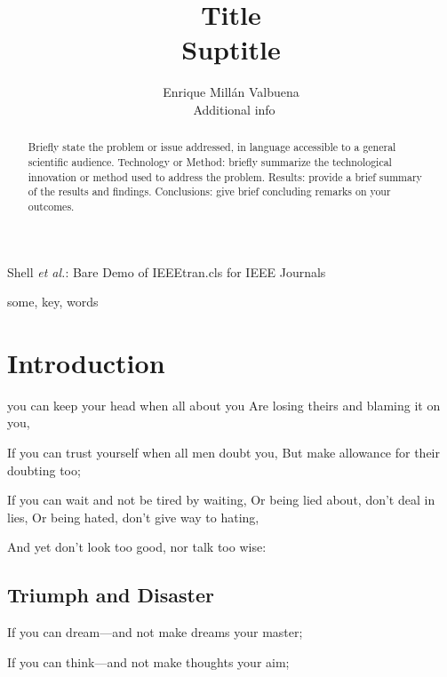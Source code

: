 \documentclass[a4paper, technote, compsoc]{IEEEtran}
\begin{document}
\title{Title \\ \Large{Suptitle}}

\author{Enrique Millán Valbuena \\ \small{Additional info}}%
        
{Shell \MakeLowercase{\textit{et al.}}: Bare Demo of IEEEtran.cls for IEEE Journals}

\maketitle

\begin{abstract}
Briefly state the problem or issue addressed, in language accessible to a general scientific audience.
Technology or Method: briefly summarize the technological innovation or method used to address the problem.
Results: provide a brief summary of the results and findings.
Conclusions: give brief concluding remarks on your outcomes.
\end{abstract}

\begin{IEEEkeywords}
some, key, words
\end{IEEEkeywords}

\section{Introduction}
 you can keep your head when all about you   
Are losing theirs and blaming it on you,   

If you can trust yourself when all men doubt you,
But make allowance for their doubting too;   

If you can wait and not be tired by waiting,
Or being lied about, don’t deal in lies,
Or being hated, don’t give way to hating,

And yet don’t look too good, nor talk too wise:

\subsection{Triumph and Disaster}

If you can dream—and not make dreams your master;   
    
If you can think—and not make thoughts your aim;   
\end{document}
